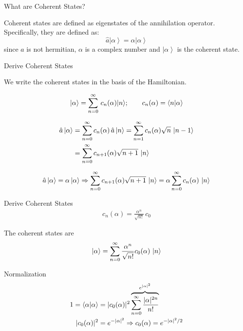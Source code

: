 \documentclass{loyola-beamer}
\begin{document}
\begin{frame}{What are Coherent States?}

	Coherent states are defined as eigenstates of the annihilation operator. Specifically, they are defined as:
	\begin{equation}
		\hat{a} \left| \alpha \right\rangle = \alpha \left| \alpha \right\rangle
	\end{equation}
	since $\hat{a}$ is not hermitian, $\alpha$ is a complex number and $\left|\alpha\right\rangle$ is the coherent state.

\end{frame}

\begin{frame}{Derive Coherent States}

	We write the coherent states in the basis of the Hamiltonian.

	\begin{align*}
		| \alpha \rangle  = \sum_{n=0}^{\infty} \, c_n(\alpha) |n \rangle;
		\qquad c_n(\alpha) = \bra{n} \ket{\alpha}
	\end{align*}

	\begin{align*}
		\hat{a} \ket{\alpha} & = \sum_{n=0}^\infty c_n(\alpha)\, \hat{a} \ket{n}
		= \sum_{n=1}^\infty c_n(\alpha)\sqrt{n}\, \ket{n-1}                            \\
		                     & = \sum_{n=0}^\infty c_{n+1}(\alpha)\sqrt{n+1}\, \ket{n}
	\end{align*}

	\begin{align*}
		\hat{a} \ket{\alpha} = \alpha \ket{\alpha} \Rightarrow
		\sum_{n=0}^\infty c_{n+1}(\alpha)\sqrt{n+1}\, \ket{n}
		= \alpha \sum_{n=0}^\infty c_{n}(\alpha)\, \ket{n}
	\end{align*}

\end{frame}

\begin{frame}{Derive Coherent States}
	\begin{align*}
		c_n(\alpha) = \frac{\alpha^n}{\sqrt{n!}}\, c_0
	\end{align*}

	The coherent states are
	\begin{align*}
		\ket{\alpha} = \sum_{n=0}^\infty \frac{\alpha^n}{\sqrt{n!}} c_0(\alpha) \, \ket{n}
	\end{align*}

	Normalization
	\begin{align*}
		1= \bra{\alpha}\ket{\alpha} & = | c_0(\alpha) |^2
		\overbrace{\sum_{n=0}^\infty \frac{|\alpha|^{2n}}{n!}}^{e^{|\alpha|^2}} \\
		| c_0(\alpha) |^2           & = e^{-|\alpha|^2}
		\Rightarrow c_0(\alpha) = e^{-|\alpha|^2/2}
	\end{align*}



\end{frame}
\end{document}
